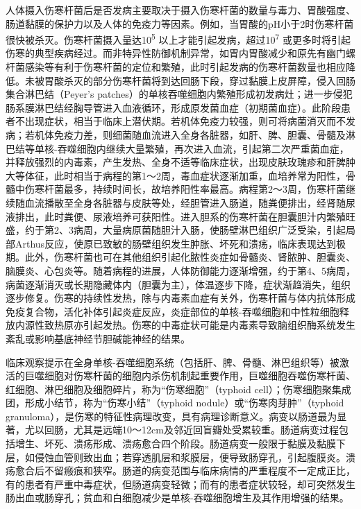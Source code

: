 人体摄入伤寒杆菌后是否发病主要取决于摄入伤寒杆菌的数量与毒力、胃酸强度、肠道黏膜的保护力以及人体的免疫力等因素。例如，当胃酸的pH小于2时伤寒杆菌很快被杀灭。伤寒杆菌摄入量达10\textsuperscript{5}
以上才能引起发病，超过10\textsuperscript{7}
或更多时将引起伤寒的典型疾病经过。而非特异性防御机制异常，如胃内胃酸减少和原先有幽门螺杆菌感染等有利于伤寒杆菌的定位和繁殖，此时引起发病的伤寒杆菌数量也相应降低。未被胃酸杀灭的部分伤寒杆菌将到达回肠下段，穿过黏膜上皮屏障，侵入回肠集合淋巴结（Peyer's
patches）的单核吞噬细胞内繁殖形成初发病灶；进一步侵犯肠系膜淋巴结经胸导管进入血液循环，形成原发菌血症（初期菌血症）。此阶段患者不出现症状，相当于临床上潜伏期。若机体免疫力较强，则可将病菌消灭而不发病；若机体免疫力差，则细菌随血流进入全身各脏器，如肝、脾、胆囊、骨髓及淋巴结等单核-吞噬细胞内继续大量繁殖，再次进入血流，引起第二次严重菌血症，并释放强烈的内毒素，产生发热、全身不适等临床症状，出现皮肤玫瑰疹和肝脾肿大等体征，此时相当于病程的第1～2周，毒血症状逐渐加重，血培养常为阳性，骨髓中伤寒杆菌最多，持续时间长，故培养阳性率最高。病程第2～3周，伤寒杆菌继续随血流播散至全身各脏器与皮肤等处，经胆管进入肠道，随粪便排出，经肾随尿液排出，此时粪便、尿液培养可获阳性。进入胆系的伤寒杆菌在胆囊胆汁内繁殖旺盛，约于第2、3病周，大量病原菌随胆汁入肠，使肠壁淋巴组织广泛受染，引起局部Arthus反应，使原已致敏的肠壁组织发生肿胀、坏死和溃疡，临床表现达到极期。此外，伤寒杆菌也可在其他组织引起化脓性炎症如骨髓炎、肾脓肿、胆囊炎、脑膜炎、心包炎等。随着病程的进展，人体防御能力逐渐增强，约于第4、5病周，病菌逐渐消灭或长期隐藏体内（胆囊为主），体温逐步下降，症状渐趋消失，组织逐步修复。伤寒的持续性发热，除与内毒素血症有关外，伤寒杆菌与体内抗体形成免疫复合物，活化补体引起炎症反应，炎症部位的单核-吞噬细胞和中性粒细胞释放内源性致热原亦引起发热。伤寒的中毒症状可能是内毒素导致脑组织酶系统发生紊乱或影响基底神经节胆碱能神经的结果。

临床观察提示在全身单核-吞噬细胞系统（包括肝、脾、骨髓、淋巴组织等）被激活的巨噬细胞对伤寒杆菌的细胞内杀伤机制起重要作用，巨噬细胞吞噬伤寒杆菌、红细胞、淋巴细胞及细胞碎片，称为“伤寒细胞”（typhoid
cell）；伤寒细胞聚集成团，形成小结节，称为“伤寒小结”（typhoid
nodule）或“伤寒肉芽肿”（typhoid
granuloma），是伤寒的特征性病理改变，具有病理诊断意义。病变以肠道最为显著，尤以回肠，尤其是远端10～12cm及邻近回盲瓣处受累较重。肠道病变过程包括增生、坏死、溃疡形成、溃疡愈合四个阶段。肠道病变一般限于黏膜及黏膜下层，如侵蚀血管则致出血；若穿透肌层和浆膜层，便导致肠穿孔，引起腹膜炎。溃疡愈合后不留瘢痕和狭窄。肠道的病变范围与临床病情的严重程度不一定成正比，有的患者有严重中毒症状，但肠道病变轻微；而有的患者症状较轻，却可突然发生肠出血或肠穿孔；贫血和白细胞减少是单核-吞噬细胞增生及其作用增强的结果。

